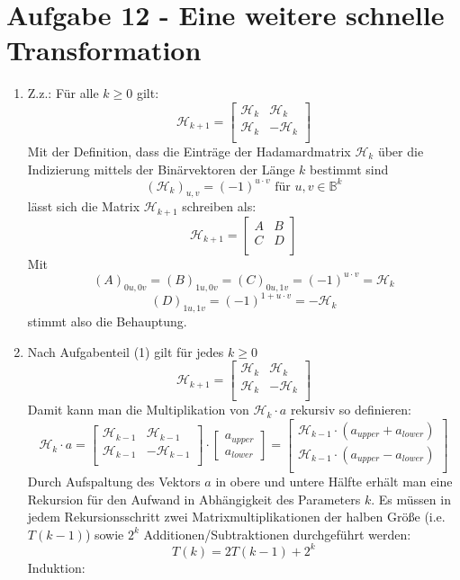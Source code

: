 \section*{Aufgabe 12 - Eine weitere schnelle Transformation}

\renewcommand{\H}{\mathcal{H}}
\begin{enumerate}[1.]
	\item Z.z.: Für alle $k \geq 0$ gilt:
	\[ \H_{k+1} = \begin{bmatrix}
		\H_k & \H_k \\
		\H_k & -\H_k \\
	\end{bmatrix} \]
	Mit der Definition, dass die Einträge der Hadamardmatrix $\H_k$ über die Indizierung
	mittels der Binärvektoren der Länge $k$ bestimmt sind
	\[ \left( \H_k \right)_{u,v} = (-1)^{u \cdot v} \text{ für } u,v \in \mathds{B}^k \]
	lässt sich die Matrix $\H_{k+1}$ schreiben als:
	\[ \H_{k+1} = \begin{bmatrix}
		A & B \\
		C & D \\
	\end{bmatrix} \]
	Mit
	\[ \left( A \right)_{0u,0v} = \left( B\right)_{1u, 0v} = \left( C \right)_{0u, 1v} = (-1)^{u \cdot v} = \H_k \]
	\[ \left( D \right)_{1u, 1v} = (-1)^{1 + u \cdot v} = - \H_k \]
	stimmt also die Behauptung.

	\item Nach Aufgabenteil (1) gilt für jedes $k \geq 0$
	\[ \H_{k+1} = \begin{bmatrix}
		\H_k & \H_k \\
		\H_k & -\H_k \\
	\end{bmatrix} \]
	Damit kann man die Multiplikation von $\H_k \cdot a$ rekursiv so definieren:
	\[ \H_k \cdot a = 
	\begin{bmatrix}
		\H_{k-1} & \H_{k-1} \\
		\H_{k-1} & -\H_{k-1} \\
	\end{bmatrix} \cdot
	\begin{bmatrix}
		a_{upper} \\
		a_{lower}
	\end{bmatrix} = 
	\begin{bmatrix}
		\H_{k-1} \cdot (a_{upper} + a_{lower}) \\
		\H_{k-1} \cdot (a_{upper} - a_{lower}) \\
	\end{bmatrix} \]
	Durch Aufspaltung des Vektors $a$ in obere und untere Hälfte erhält man
	eine Rekursion für den Aufwand in Abhängigkeit des Parameters $k$. Es
	müssen in jedem Rekursionsschritt zwei Matrixmultiplikationen der
	halben Größe (i.e. $T(k-1)$) sowie $2^k$ Additionen/Subtraktionen
	durchgeführt werden:
	\[ T(k) = 2 T(k-1) + 2^k \]
	Induktion:


\end{enumerate}
